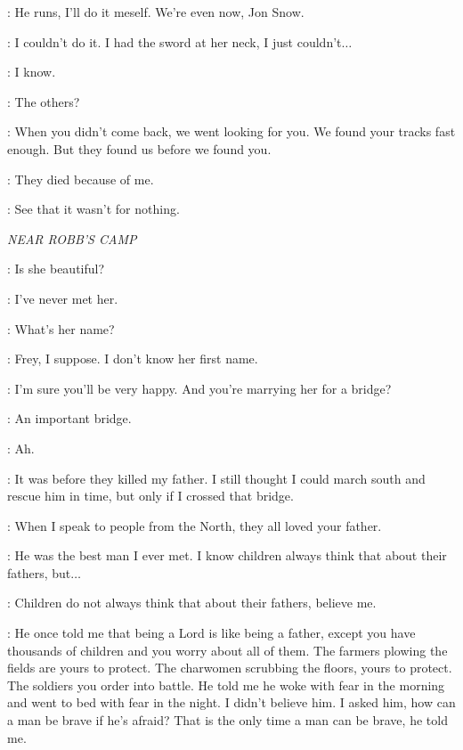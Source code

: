 \YGRITTE: He runs, I'll do it meself. We're even now, Jon Snow. 


\JON: I couldn't do it. I had the sword at her neck, I just couldn't$\ldots$  

\HALFHAND: I know. 

\JON: The others? 

\HALFHAND: When you didn't come back, we went looking for you. We found your tracks fast enough. But they found us before we found you. 

\JON: They died because of me. 

\HALFHAND: See that it wasn't for nothing. 


\scene

\textit{NEAR ROBB'S CAMP} 


\TALISA: Is she beautiful? 

\ROBB: I've never met her. 

\TALISA: What's her name? 

\ROBB: Frey, I suppose. I don't know her first name. 

\TALISA: I'm sure you'll be very happy.  And you're marrying her for a bridge? 

\ROBB: An important bridge. 

\TALISA: Ah. 

\ROBB: It was before they killed my father. I still thought I could march south and rescue him in time, but only if I crossed that bridge. 

\TALISA: When I speak to people from the North, they all loved your father. 

\ROBB: He was the best man I ever met. I know children always think that about their fathers, but$\ldots$  

\TALISA: Children do not always think that about their fathers, believe me. 

\ROBB: He once told me that being a Lord is like being a father, except you have thousands of children and you worry about all of them. The farmers plowing the fields are yours to protect. The charwomen scrubbing the floors, yours to protect. The soldiers you order into battle. He told me he woke with fear in the morning and went to bed with fear in the night. I didn't believe him. I asked him, how can a man be brave if he's afraid? That is the only time a man can be brave, he told me. 

